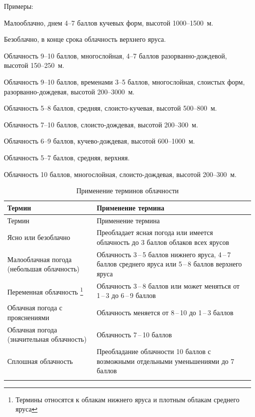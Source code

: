 \documentclass[a4paper, 12pt, twoside, final, book, russian, fittopage, cyremdash, openright]{ncc}
\newcommand{\otdo}{\,--\,}
\begin{document}
Примеры:
\begin{list}{}{}
\item Малооблачно, днем 4--7 баллов кучевых форм, высотой 1000--1500~м.
\item Безоблачно, в конце срока облачность верхнего яруса.
\item Облачность 9--10 баллов, многослойная, 4--7 баллов разорванно-дождевой, высотой 150--250~м.
\item Облачность 9--10 баллов, временами 3--5 баллов, многослойная, слоистых форм, разорванно-дождевая, высотой 200--3000~м.
\item Облачность 5--8 баллов, средняя, слоисто-кучевая, высотой 500--800~м.
\item Облачность 7--10 баллов, слоисто-дождевая, высотой 200--300~м.
\item Облачность 6--9 баллов, кучево-дождевая, высотой 600--1000~м.
\item Облачность 5--7 баллов, средняя, верхняя.
\item Облачность 10 баллов, многослойная, слоисто-дождевая, высотой 200--300~м.
\end{list}

\begin{longtable}{p{}|p{}}
  \toprule
  Термин & Применение термина \\
  \midrule
  \endfirsthead
  \toprule
  Термин & Применение термина \\
  \midrule
  \endhead
  Ясно или безоблачно
         & Преобладает ясная погода или имеется облачность до 3 баллов облаков всех ярусов \\
  \midrule
  Малооблачная погода (небольшая облачность)
         & Облачность 3\otdo5 баллов нижнего яруса, 4\otdo7 баллов среднего яруса или 5\otdo8 баллов верхнего яруса \\
  \midrule
  Переменная облачность \footnote{Термины относятся к облакам нижнего яруса и плотным облакам среднего яруса}
         & Облачность 3\otdo8 баллов или может меняться от 1\otdo3 до 6\otdo9 баллов \\
  \midrule
  Облачная погода с прояснениями
         & Облачность меняется от 8\otdo10 до 1\otdo3 баллов \\
  \midrule
  Облачная погода (значительная облачность)
         & Облачность 7\otdo10 баллов \\
  \midrule
  Сплошная облачность
         & Преобладание облачности 10 баллов с возможными отдельными уменьшениями до 7 баллов \\
  \bottomrule
  \caption{Применение терминов облачности}
\end{longtable}
\end{document}

